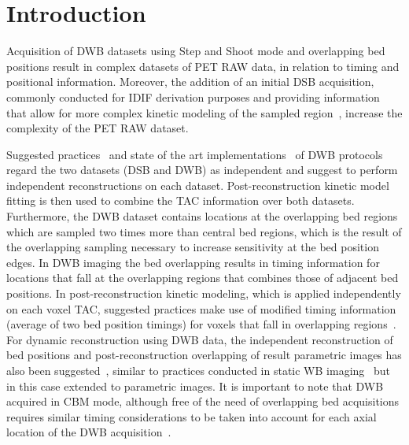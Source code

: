 \section{Introduction}
Acquisition of DWB datasets using Step and Shoot mode and overlapping bed positions result in complex datasets of PET RAW data, in relation to timing and positional information. Moreover, the addition of an initial DSB acquisition, commonly conducted for IDIF derivation purposes and providing information that allow for more complex kinetic modeling of the sampled region~\cite{Zaker2020}, increase the complexity of the PET RAW dataset. 

Suggested practices~\cite{Karakatsanis2013} and state of the art implementations~\cite{Hu2020} of DWB protocols regard the two datasets (DSB and DWB) as independent and suggest to perform independent reconstructions on each dataset. Post-reconstruction kinetic model fitting is then used to combine the TAC information over both datasets. 
Furthermore, the DWB dataset contains locations at the overlapping bed regions which are sampled two times more than central bed regions, which is the result of the overlapping sampling necessary to increase sensitivity at the bed position edges. In DWB imaging the bed overlapping results in timing information for locations that fall at the overlapping regions that combines those of adjacent bed positions. In post-reconstruction kinetic modeling, which is applied independently on each voxel TAC, suggested practices make use of modified timing information (average of two bed position timings) for voxels that fall in overlapping regions~\cite{Karakatsanis2013}. 
For dynamic reconstruction using DWB data, the independent reconstruction of bed positions and post-reconstruction overlapping of result parametric images has also been suggested~\cite{Karakatsanis2016a}, similar to practices conducted in static WB imaging~\cite{Schubert1996} but in this case extended to parametric images.
It is important to note that DWB acquired in CBM mode, although free of the need of overlapping bed acquisitions requires similar timing considerations to be taken into account for each axial location of the DWB acquisition~\cite{Karakatsanis2016b,Hu2020}.

